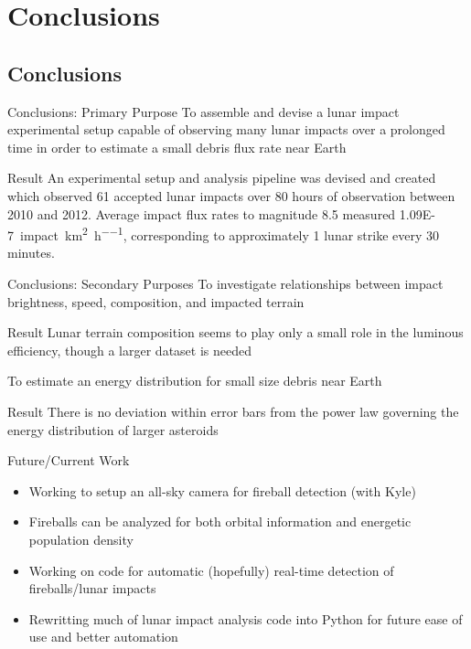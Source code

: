 \documentclass[pdf]{beamer}
\begin{document}
 \section{Conclusions}

 \subsection{Conclusions}

 \begin{frame}{Conclusions: Primary Purpose}
		To assemble and devise a lunar impact experimental setup capable of observing many lunar impacts over a prolonged time in order to estimate a small debris flux rate near Earth
		\begin{block}{Result}
			An experimental setup and analysis pipeline was devised and created which observed 61 accepted lunar impacts over 80 hours of observation between 2010 and 2012. Average impact flux rates to magnitude 8.5 measured \SI{1.09E-7}{impact\per\kilo\meter^2\per\hour}, corresponding to approximately 1 lunar strike every 30 minutes.
		\end{block}
 \end{frame}

 \begin{frame}{Conclusions: Secondary Purposes}
		To investigate relationships between impact brightness, speed, composition, and impacted terrain
		\begin{block}{Result}
		  Lunar terrain composition seems to play only a small role in the luminous efficiency, though a larger dataset is needed
		\end{block}
		To estimate an energy distribution for small size debris near Earth
		\begin{block}{Result}
		  There is no deviation within error bars from the power law governing the energy distribution of larger asteroids
		\end{block}
\end{frame}

 \begin{frame}{Future/Current Work}
   \begin{itemize}
	 \item Working to setup an all-sky camera for fireball detection (with Kyle)
	 \item Fireballs can be analyzed for both orbital information and energetic population density
	 \item Working on code for automatic (hopefully) real-time detection of fireballs/lunar impacts
	 \item Rewritting much of lunar impact analysis code into Python for future ease of use and better automation
   \end{itemize}
 \end{frame}
\end{document}
